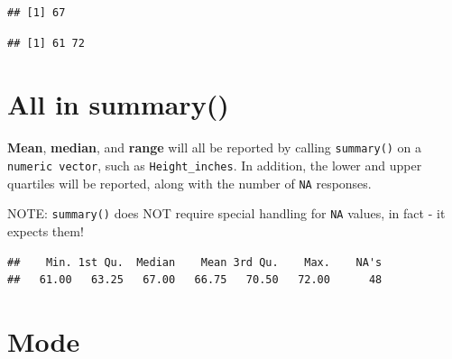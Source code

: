 \documentclass[
]{book}
\newenvironment{Shaded}{\begin{snugshade}}{\end{snugshade}}
\newcommand{\AttributeTok}[1]{\textcolor[rgb]{0.77,0.63,0.00}{#1}}
\newcommand{\FunctionTok}[1]{\textcolor[rgb]{0.00,0.00,0.00}{#1}}
\newcommand{\NormalTok}[1]{#1}
\newcommand{\SpecialCharTok}[1]{\textcolor[rgb]{0.00,0.00,0.00}{#1}}
\begin{document}
\begin{Shaded}
\end{Shaded}

\begin{verbatim}
## [1] 67
\end{verbatim}

\begin{Shaded}
\end{Shaded}

\begin{verbatim}
## [1] 61 72
\end{verbatim}

\hypertarget{all-in-summary-1}{%
\section*{All in summary()}\label{all-in-summary-1}}

\textbf{Mean}, \textbf{median}, and \textbf{range} will all be reported by calling \texttt{summary()} on a \texttt{numeric\ vector}, such as \texttt{Height\_inches}. In addition, the lower and upper quartiles will be reported, along with the number of \texttt{NA} responses.

NOTE: \texttt{summary()} does NOT require special handling for \texttt{NA} values, in fact - it expects them!

\begin{Shaded}
\end{Shaded}

\begin{verbatim}
##    Min. 1st Qu.  Median    Mean 3rd Qu.    Max.    NA's 
##   61.00   63.25   67.00   66.75   70.50   72.00      48
\end{verbatim}

\hypertarget{mode}{%
\section*{Mode}\label{mode}}
\end{document}
